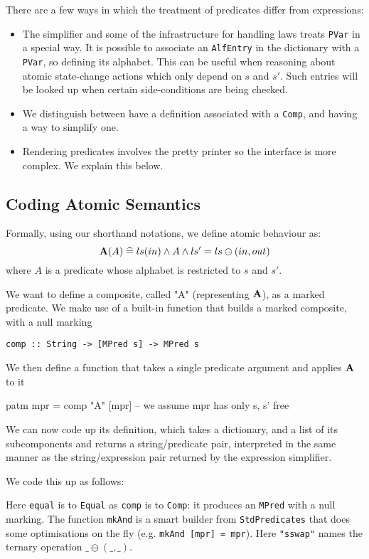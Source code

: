 There are a few ways in which the treatment of predicates
differ from expressions:
\begin{itemize}
  \item
    The simplifier and some of the infrastructure for handling
    laws treats \texttt{PVar} in a special way.
    It is possible to associate an \texttt{AlfEntry} in the dictionary
    with a \texttt{PVar}, so defining its alphabet.
    This can be useful when reasoning about atomic state-change
    actions which only depend on $s$ and $s'$.
    Such entries will be looked up when certain 
    side-conditions are being checked.
  \item
    We distinguish between have a definition associated with a \texttt{Comp},
    and having a way to simplify one.
  \item 
    Rendering predicates involves the pretty printer
    so the interface is more complex.
    We explain this below.
\end{itemize}



\subsection{Coding Atomic Semantics}

Formally, using our shorthand notations, we define atomic behaviour as:
\[
    \mathbf{A}(A) \mathrel{\widehat=} ls(in) \land A \land ls'=ls\ominus(in,out)
\]
where $A$ is a predicate whose alphabet is restricted to $s$ and $s'$.

We want to define a composite, called "A" (representing $\mathbf{A}$),
as a marked predicate.
We make use of a built-in function that builds
a marked composite, with a null marking
\begin{verbatim}
comp :: String -> [MPred s] -> MPred s
\end{verbatim}
We then define a function that takes a single predicate argument
and applies $\mathbf{A}$ to it
\begin{code}
patm mpr = comp "A" [mpr] -- we assume mpr has only s, s' free
\end{code}
We can now code up its definition,
which takes a dictionary, and a list of its subcomponents
and returns a string/predicate pair,
interpreted in the same manner as the string/expression pair
returned by the expression simplifier.

We code this up as follows:
Here \texttt{equal} is to \texttt{Equal} as \texttt{comp} is to \texttt{Comp}: 
it produces an \texttt{MPred} with a null marking.
The function \texttt{mkAnd} is a smart builder from \texttt{StdPredicates}
that does some optimisations on the fly (e.g. \verb$mkAnd [mpr] = mpr$).
Here \texttt{"sswap"} names the ternary operation $\_\ominus(\_,\_)$.

